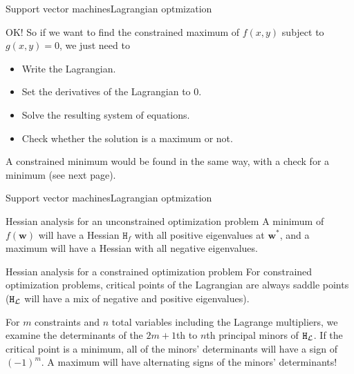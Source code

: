 \documentclass{beamer}
\renewcommand{\vec}[1]{\boldsymbol{#1}}
\newcommand{\mat}[1]{\mathtt{#1}}
\begin{document}
\begin{frame}{Support vector machines}{Lagrangian optmization}

  OK! So if we want to find the constrained maximum of $f(x,y)$ subject
  to $g(x,y)=0$, we just need
  to
  \begin{itemize}
  \item Write the Lagrangian.
  \item Set the derivatives of the Lagrangian to 0.
  \item Solve the resulting system
    of equations.
  \item Check whether the solution is a maximum or not.
  \end{itemize}

  \medskip

  A constrained minimum would be found in the same way, with a check
  for a minimum (see next page).

\end{frame}


\begin{frame}{Support vector machines}{Lagrangian optmization}

  \begin{block}{Hessian analysis for
      an \alert{unconstrained} optimization problem} A \alert{minimum}
    of $f(\vec{w})$ will have a Hessian $\mat{H}_f$ with all
    \alert{positive} eigenvalues at $\vec{w}^*$, and a \alert{maximum}
    will have a Hessian with all \alert{negative} eigenvalues.
  \end{block}
    
  \begin{block}{Hessian analysis for
      a \alert{constrained} optimization problem}
    For constrained optimization problems, critical points of the
    Lagrangian are \alert{always saddle points} ($\mat{H}_{\cal L}$
    will have a mix of negative and positive eigenvalues).

    \medskip

    For $m$ constraints and $n$ total variables including the Lagrange
    multipliers, we examine the determinants of the $2m+1$th to $n$th principal minors of
    $\mat{H}_{\cal L}$. If the critical point is a minimum, all of the minors' determinants will have a sign of $(-1)^m$. A maximum will have alternating
    signs of the minors' determinants!
  \end{block}
    
\end{frame}
\end{document}
